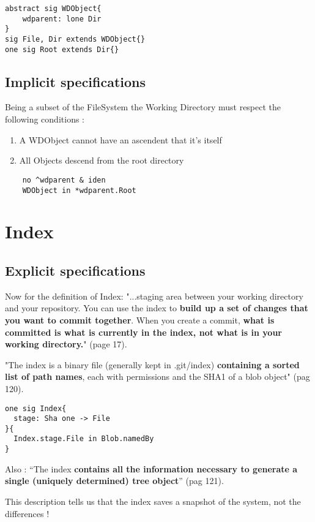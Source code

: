 \begin{lstlisting}
abstract sig WDObject{
	wdparent: lone Dir
}
sig File, Dir extends WDObject{}
one sig Root extends Dir{}
\end{lstlisting}

\subsection{Implicit specifications}

Being a subset of the FileSystem the Working Directory must respect
the following conditions :
	\begin{enumerate}
		\item A WDObject cannot have an ascendent that it's itself
		\item All Objects descend from the root directory
	\end{enumerate}

\begin{lstlisting}
	no ^wdparent & iden
	WDObject in *wdparent.Root
\end{lstlisting}


\section{Index}

\subsection{Explicit specifications}

Now for the definition of Index:
"...staging area between your working directory and your
repository. You can use the index to {\bf build up a set of 
changes that you want to commit together}. When you create
a commit, {\bf what is committed is what is currently in the
index, not what is in your working directory.}"
\cite{gitComm} (page 17). \par

"The index is a binary file (generally kept in .git/index) 
{\bf containing a sorted list of path names}, each with permissions and the
SHA1 of a blob object" \cite{gitComm} (pag 120). \par 

\begin{lstlisting}
one sig Index{	
  stage: Sha one -> File
}{
  Index.stage.File in Blob.namedBy
}
\end{lstlisting}

Also : ``The index {\bf contains all the information necessary to generate a single
(uniquely determined) tree object}'' \cite{gitComm} (pag 121). \par
This description tells us that the index saves a snapshot of the system,
not the differences !


